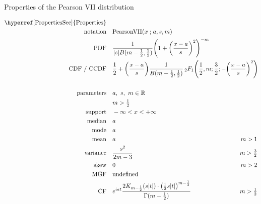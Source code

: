 

\begin{table*}[p]
\caption[Pearson VII distribution -- Properties]{Properties of the Pearson VII distribution}
\begin{align*}
\text{\hyperref[PropertiesSec]{Properties}}  \quad& \\
\text{notation} \quad & \text{PearsonVII}(x\given a,s, m) \checked
\\
\text{PDF}\quad &   \frac{1}{|s| B(m-\frac{1}{2}, \frac{1}{2} )} \Left( 1 +\Left( \frac{x-a}{s}\Right)^2 \Right)^{-m} \checked
\\
\text{CDF / CCDF} \quad  &  
     \frac{1}{2} +  \Left(\frac{x-a}{s}\Right) 
     \frac{1}{B(m-\frac{1}{2}, \frac{1}{2})}
     \,_2F_1 \Left ( \frac{1}{2},m;\frac{3}{2}; -\Left(\frac{x-a}{s}\Right)^2 \Right)
     \checked
     \hspace{-4em}
     \\
     &
\\
\text{parameters}\quad &   a,\ s,\ m  \in \Real \\ & m>\tfrac{1}{2} \checked
\\
\text{support} \quad &   -\infty < x < +\infty	\checked
\\
\text{median} \quad  &  a					\checked
\\
\text{mode} \quad  & a	\checked
\\
\text{mean} \quad  &  a & m>1	\checked
\\
\text{variance} \quad  & \frac{s^2}{2m-3} & m>\tfrac{3}{2} \checked
\\
\text{skew} \quad  &  0 \checked & m>2 \checked
\\
\text{MGF} \quad  &  \text{undefined}
\\
\text{CF} \quad  &   e^{iat} \frac{2 K_{m-\half} \Left( s |t|\Right)
                    \cdot \Left(\half s |t| \Right)^{m-\half}}
                    {\Gamma(m-\half)}  & m > \half
                    \checked
\end{align*}
\end{table*}